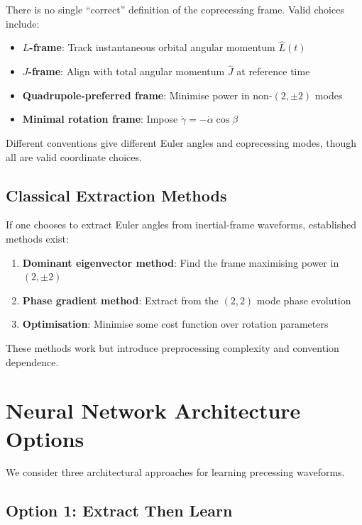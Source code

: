 \documentclass[11pt,a4paper]{article}
\begin{document}
There is no single ``correct'' definition of the coprecessing frame. Valid choices include:
\begin{itemize}
    \item \textbf{$L$-frame}: Track instantaneous orbital angular momentum $\hat{L}(t)$
    \item \textbf{$J$-frame}: Align with total angular momentum $\hat{J}$ at reference time
    \item \textbf{Quadrupole-preferred frame}: Minimise power in non-$(2,\pm2)$ modes
    \item \textbf{Minimal rotation frame}: Impose $\dot{\gamma} = -\dot{\alpha}\cos\beta$
\end{itemize}

Different conventions give different Euler angles and coprecessing modes, though all are valid coordinate choices.

\subsection{Classical Extraction Methods}

If one chooses to extract Euler angles from inertial-frame waveforms, established methods exist:
\begin{enumerate}
    \item \textbf{Dominant eigenvector method}: Find the frame maximising power in $(2,\pm2)$
    \item \textbf{Phase gradient method}: Extract from the $(2,2)$ mode phase evolution
    \item \textbf{Optimisation}: Minimise some cost function over rotation parameters
\end{enumerate}

These methods work but introduce preprocessing complexity and convention dependence.

\section{Neural Network Architecture Options}

We consider three architectural approaches for learning precessing waveforms.

\subsection{Option 1: Extract Then Learn}
\end{document}
